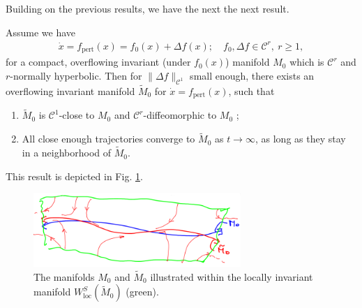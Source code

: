 Building on the previous results, we have the next the next result.
\begin{theorem}[Fenichel (1971)]
Assume we have
\begin{align}
	\dot{x}= f_{ \textrm{pert} }(x) = f_{0}(x) + \Delta f(x);\quad f_0, \Delta f \in \mathcal{C}^{r},\ r\geq 1,
\end{align}
for a compact, overflowing invariant (under $f_0(x)$) manifold $M_0$ which is $\mathcal{C}^{r}$ and $r$-normally hyperbolic. Then for $\|\Delta f \|_{\mathcal{C}^{1}}$ small enough, there exists an overflowing invariant manifold $\tilde{M}_0$ for $\dot{x}=f_{ \textrm{pert} }(x)$, such that
\begin{enumerate}
	\item $\tilde{M}_{0}$ is $\mathcal{C}^{1}$-close to $M_0$ and $\mathcal{C}^{r}$-diffeomorphic to $M_0$ ;
	\item All close enough trajectories converge to $\tilde{M}_{0}$ as $t \to \infty $, as long as they stay in a neighborhood of $\tilde{M}_{0}$.
\end{enumerate}
This result is depicted in Fig. \ref{fig:fenichel_thm2}.
\begin{figure}[h!]
	\centering
	\includegraphics[width=0.7\textwidth]{figures/ch9/15fenichel_thm2.png}
	\caption{The manifolds $M_0$ and $\tilde{M}_{0}$ illustrated within the locally invariant manifold $W^{S}_{ \textrm{loc} }(\tilde{M}_{0})$ (green).}
	\label{fig:fenichel_thm2}
\end{figure}
\end{theorem}

